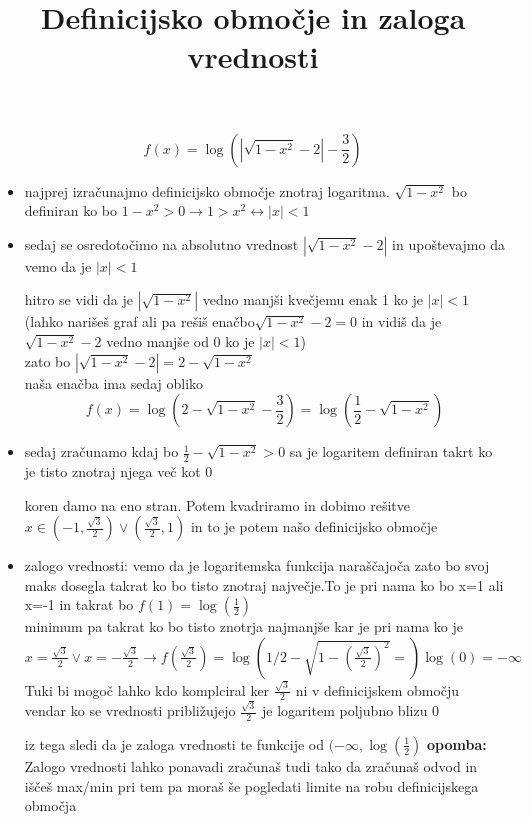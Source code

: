 \documentclass[a4paper]{article}
\begin{document}
\title{Definicijsko območje in zaloga vrednosti}
\maketitle
\[f(x)=\log(|\sqrt{1-x^2}-2|-\frac{3}{2})\]
\begin{itemize}

\item najprej izračunajmo definicijsko območje znotraj logaritma.
\(\sqrt{1-x^2}\) bo definiran ko bo $1-x^2>0\rightarrow 1>x^2\leftrightarrow |x|<1$
\\
\item sedaj se osredotočimo na absolutno vrednost $|\sqrt{1-x^2}-2|$ in upoštevajmo da vemo da je $|x|<1$

hitro se vidi da je $|\sqrt{1-x^2} |$ vedno manjši kvečjemu enak 1 ko je $|x|<1$ (lahko narišeš graf ali pa rešiš enačbo$\sqrt{1-x^2}-2=0$ in vidiš da je $\sqrt{1-x^2}-2$ vedno manjše od 0 ko je  $|x|<1$)\\
zato bo $|\sqrt{1-x^2}-2|=2-\sqrt{1-x^2}$
\\

naša enačba ima sedaj obliko\[f(x)=\log(2-\sqrt{1-x^2}-\frac{3}{2})=\log(\frac{1}{2}-\sqrt{1-x^2})\]

\item sedaj zračunamo kdaj bo $\frac{1}{2}-\sqrt{1-x^2}>0$ sa je logaritem definiran takrt ko je tisto znotraj njega več kot 0

koren damo na eno stran. Potem kvadriramo in dobimo rešitve $x\in(-1,\frac{\sqrt{3}}{2})\lor(\frac{\sqrt{3}}{2},1)$ in to je potem našo definicijsko območje

\item zalogo vrednosti: vemo da je logaritemska funkcija naraščajoča zato bo svoj maks dosegla takrat ko bo tisto znotraj največje.To je pri nama ko bo x=1 ali x=-1 in takrat bo $f(1)=\log(\frac{1}{2})$ \\
 minimum pa takrat ko bo tisto znotrja najmanjše kar je pri nama ko je $x=\frac{\sqrt{3}}{2}\lor x=-\frac{\sqrt{3}}{2}\rightarrow f(\frac{\sqrt{3}}{2})=\log(1/2-\sqrt{1-(\frac{\sqrt{3}}{2})^{2}} =)\log(0)=-\infty$ Tuki bi mogoč lahko kdo komplciral ker $\frac{\sqrt{3}}{2}$ ni v definicijskem območju vendar ko se vrednosti približujejo $\frac{\sqrt{3}}{2}$ je logaritem poljubno blizu 0
 
 iz tega sledi da je zaloga vrednosti te funkcije od $(-\infty,\log(\frac{1}{2})$
 \textbf{opomba: } Zalogo vrednosti lahko ponavadi zračunaš tudi tako da zračunaš odvod in iščeš max/min pri tem pa moraš še pogledati limite na robu definicijskega območja 


\end{itemize}
\end{document}
